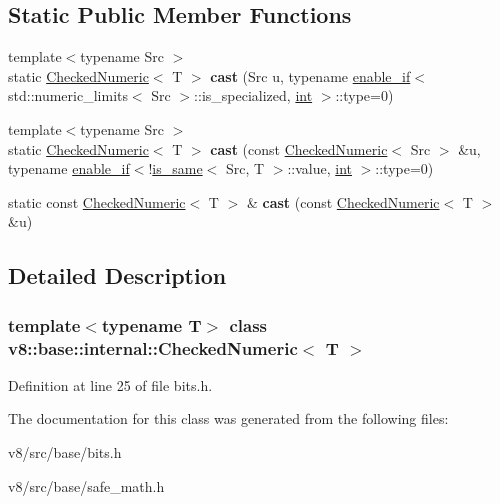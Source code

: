\subsection*{Static Public Member Functions}
\begin{DoxyCompactItemize}
\item 
\mbox{\label{classv8_1_1base_1_1internal_1_1CheckedNumeric_a3aa54c4ca2d087a313ad7ca35adbe0f9}} 
{\footnotesize template$<$typename Src $>$ }\\static \mbox{\hyperlink{classv8_1_1base_1_1internal_1_1CheckedNumeric}{Checked\+Numeric}}$<$ T $>$ {\bfseries cast} (Src u, typename \mbox{\hyperlink{structv8_1_1base_1_1internal_1_1enable__if}{enable\+\_\+if}}$<$ std\+::numeric\+\_\+limits$<$ Src $>$\+::is\+\_\+specialized, \mbox{\hyperlink{classint}{int}} $>$\+::type=0)
\item 
\mbox{\label{classv8_1_1base_1_1internal_1_1CheckedNumeric_a22783d28fd6d369881fcfd5ea0c81051}} 
{\footnotesize template$<$typename Src $>$ }\\static \mbox{\hyperlink{classv8_1_1base_1_1internal_1_1CheckedNumeric}{Checked\+Numeric}}$<$ T $>$ {\bfseries cast} (const \mbox{\hyperlink{classv8_1_1base_1_1internal_1_1CheckedNumeric}{Checked\+Numeric}}$<$ Src $>$ \&u, typename \mbox{\hyperlink{structv8_1_1base_1_1internal_1_1enable__if}{enable\+\_\+if}}$<$!\mbox{\hyperlink{structv8_1_1base_1_1internal_1_1is__same}{is\+\_\+same}}$<$ Src, T $>$\+::value, \mbox{\hyperlink{classint}{int}} $>$\+::type=0)
\item 
\mbox{\label{classv8_1_1base_1_1internal_1_1CheckedNumeric_aac2033a3fb2b3c6f6709285b375fa102}} 
static const \mbox{\hyperlink{classv8_1_1base_1_1internal_1_1CheckedNumeric}{Checked\+Numeric}}$<$ T $>$ \& {\bfseries cast} (const \mbox{\hyperlink{classv8_1_1base_1_1internal_1_1CheckedNumeric}{Checked\+Numeric}}$<$ T $>$ \&u)
\end{DoxyCompactItemize}


\subsection{Detailed Description}
\subsubsection*{template$<$typename T$>$\newline
class v8\+::base\+::internal\+::\+Checked\+Numeric$<$ T $>$}



Definition at line 25 of file bits.\+h.



The documentation for this class was generated from the following files\+:\begin{DoxyCompactItemize}
\item 
v8/src/base/bits.\+h\item 
v8/src/base/safe\+\_\+math.\+h\end{DoxyCompactItemize}
